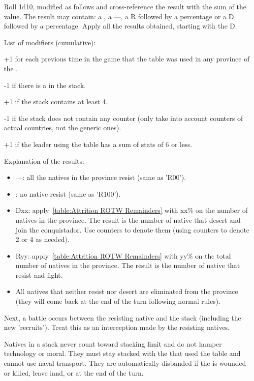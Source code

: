 Roll 1d10, modified as follows and cross-reference the result with the sum of
the \LeaderC value. The result may contain: a \textdag, a ---, a R followed by
a percentage or a D followed by a percentage. Apply all the results obtained,
starting with the D.

List of modifiers (cumulative):
\begin{modlist}
\item[+1] for each previous time in the game that the table was used in any
  province of the \Area.
\item[-1] if there is a \LeaderMis in the stack.
\item[+1] if the stack contains at least 4\LD.
\item[-1] if the stack does not contain any \ARMY counter (only take into
  account counters of actual countries, not the generic  ones).
\item[+1] if the leader using the table has a sum of stats of 6 or less.
\end{modlist}

Explanation of the results:
\begin{itemize}
\item ---: all the natives in the province resist (same as 'R00').
\item \textdag: no native resist (same as 'R100').
\item Dxx: apply~\ref{table:Attrition ROTW Remainders} with xx\% on the number
  of natives in the province. The result is the number of native \LD that
  desert and join the conquistador. Use  counters to denote them
  (using \ARMY counters to denote 2 or 4 \LD as needed).
\item Ryy: apply~\ref{table:Attrition ROTW Remainders} with yy\% on the total
  number of natives in the province. The result is the number of native \LD
  that resist and fight.
\item All natives that neither resist nor desert are eliminated from the
  province (they will come back at the end of the turn following normal
  rules).
\end{itemize}

Next, a battle occurs between the resisting native and the stack (including
the new 'recruits'). Treat this as an interception made by the resisting
natives.

Natives in a stack never count toward stacking limit and do not hamper
technology or moral. They must stay stacked with the \LeaderC that used the
table and cannot use naval transport. They are automatically disbanded if the
\LeaderC is wounded or killed, leave land, or at the end of the turn.

